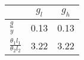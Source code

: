 \begin{tiny}\begin{tabular}{|l|c|c|}
\hline
&\textbf{$g_l$}&\textbf{$g_h$}\\\hline
\textbf{$\frac{g}{y}$}&0.13&0.13\\\hline
\textbf{$\frac{\theta_1 l_1}{\theta_2 l_2}$}&3.22&3.22\\\hline
\end{tabular}
\end{tiny}